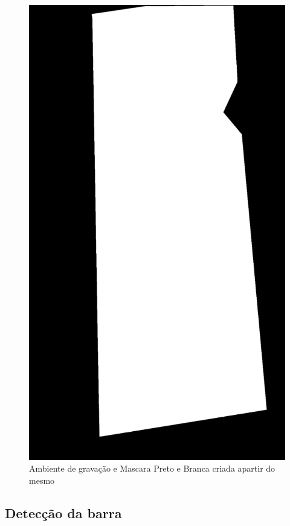 \begin{figure}[htbp]
\begin{minipage}{0.4\textwidth}
            \includegraphics[width=\textwidth]{figuras/filter/mask/mask.png}
        \end{minipage}
    \caption{Ambiente de gravação e Mascara Preto e Branca criada apartir do mesmo}
    \label{fig:maskAmbiente}
\end{figure}
\newpage

\subsection[Detecção da barra]{Detecção da barra}\label{sec:Deteccao da barra}

